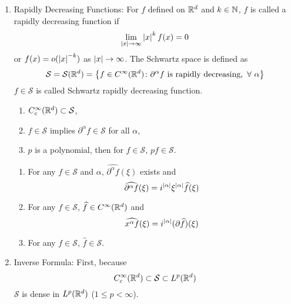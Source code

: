 \begin{enumerate}[label=\arabic*.]
	\item Rapidly Decreasing Functions: For $f$ defined on $\mathbb{R}^d$ and $k \in \mathbb{N}$, $f$ is called a rapidly decreasing function if
	\begin{equation*}
		\lim_{\left\lvert x\right\lvert \rightarrow \infty} \left\lvert x\right\lvert^kf(x) = 0
	\end{equation*}
	or $f(x) = o(\left\lvert x\right\lvert^{-k})$ as $\left\lvert x\right\lvert \rightarrow \infty$. The Schwartz space is defined as
	\begin{equation*}
		\mathcal{S} = \mathcal{S}(\mathbb{R}^d) = \left\{f \in C^\infty(\mathbb{R}^d) \colon \partial^\alpha f \text{ is rapidly decreasing},~\forall~\alpha\right\}
	\end{equation*}
	$f \in \mathcal{S}$ is called Schwartz rapidly decreasing function. 
	\begin{prop}
		\begin{enumerate}[label=(\arabic{*})]
			\item $C_c^\infty(\mathbb{R}^d) \subset \mathcal{S}$,
			\item $f \in \mathcal{S}$ implies $\partial^\alpha f \in \mathcal{S}$ for all $\alpha$,
			\item $p$ is a polynomial, then for $f \in \mathcal{S}$, $pf \in \mathcal{S}$.
		\end{enumerate}
	\end{prop}

	\begin{prop}
		\begin{enumerate}[label = (\arabic*)]
			\item For any $f \in \mathcal{S}$ and $\alpha$, $\widehat{\partial^\alpha f}(\xi)$ exists and 
			\begin{equation*}
				\widehat{\partial^\alpha f}(\xi) = i^{\left\lvert\alpha\right\lvert}\xi^{\left\lvert\alpha\right\lvert}\widehat{f}(\xi)
			\end{equation*}
			\item For any $f \in \mathcal{S}$, $\widehat{f} \in C^\infty(\mathbb{R}^d)$ and
			\begin{equation*}
				\widehat{x^\alpha f}(\xi) = i^{\left\lvert\alpha\right\lvert}(\partial \widehat{f})(\xi)
			\end{equation*}
			\item For any $f \in \mathcal{S}$, $\widehat{f} \in \mathcal{S}$.
		\end{enumerate}
	\end{prop}

	\item Inverse Formula: First, because
	\begin{equation*}
		C_c^\infty(\mathbb{R}^d) \subset \mathcal{S} \subset L^p(\mathbb{R}^d)
	\end{equation*}
	$\mathcal{S}$ is dense in $L^p(\mathbb{R}^d)$ ($1 \leq p < \infty$).


\end{enumerate}
